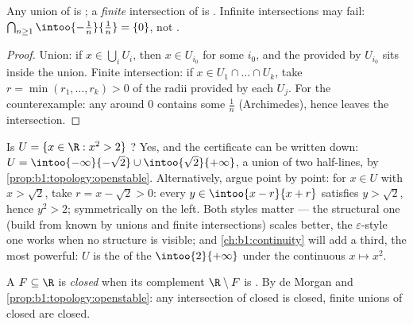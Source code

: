 \begin{proposition}\label{prop:b1:topology:openstable}
Any union of  is ; a \emph{finite} intersection of  is . Infinite intersections may fail:
$\bigcap_{n \geq 1} \intoo{-\frac 1n}{\frac 1n} = \{0\}$, not .
\end{proposition}

\begin{proof}
Union: if $x \in \bigcup_i U_i$, then $x \in U_{i_0}$ for some $i_0$,
and the  provided by $U_{i_0}$ sits inside the union. Finite
intersection: if $x \in U_1 \cap \dots \cap U_k$, take $r = \min(r_1,
\dots, r_k) > 0$ of the radii provided by each $U_j$. For the
counterexample: any  around $0$ contains some $\frac{1}{n}$
(Archimedes), hence leaves the intersection.
\end{proof}

\begin{example}\label{ex:b1:topology:radii}
Is $U = \{x \in \R : x^2 > 2\}$ ? Yes, and the certificate
can be written down: $U = \intoo{-\infty}{-\sqrt2} \cup
\intoo{\sqrt2}{+\infty}$, a union of two  half-lines, 
by \cref{prop:b1:topology:openstable}. Alternatively, argue
point by point: for $x \in U$ with $x > \sqrt 2$, take $r = x -
\sqrt2 > 0$: every $y \in \intoo{x - r}{x + r}$ satisfies $y >
\sqrt 2$, hence $y^2 > 2$; symmetrically on the left. Both
styles matter --- the structural one (build from known  by unions and finite intersections) scales better, the
$\varepsilon$-style one works when no structure is visible; and
\cref{ch:b1:continuity} will add a third, the most powerful:
$U$ is the  of the  $\intoo{2}{+\infty}$ under the
continuous $x \mapsto x^2$.
\end{example}

\begin{definition}\label{def:b1:topology:closed}
A  $F \subseteq \R$ is \emph{closed} when its
complement $\R \setminus F$ is . By de Morgan and
\cref{prop:b1:topology:openstable}: any intersection of closed 
is closed, finite unions of closed  are closed.
\end{definition}


